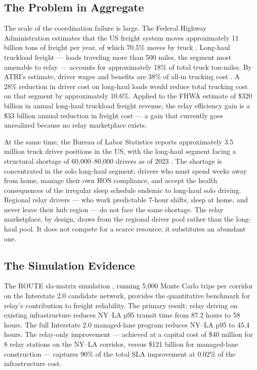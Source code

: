 \subsection*{The Problem in Aggregate}

The scale of the coordination failure is large. The Federal Highway Administration estimates that the US freight system moves approximately 11 billion tons of freight per year, of which 70.5\% moves by truck \citep{FHWA_freight2023}. Long-haul truckload freight --- loads traveling more than 500 miles, the segment most amenable to relay --- accounts for approximately 18\% of total truck ton-miles. By ATRI's estimate, driver wages and benefits are 38\% of all-in trucking cost \citep{ATRI_shortage2024}. A 28\% reduction in driver cost on long-haul loads would reduce total trucking cost on that segment by approximately 10.6\%. Applied to the FHWA estimate of \$320 billion in annual long-haul truckload freight revenue, the relay efficiency gain is a \$33 billion annual reduction in freight cost --- a gain that currently goes unrealized because no relay marketplace exists.

At the same time, the Bureau of Labor Statistics reports approximately 3.5 million truck driver positions in the US, with the long-haul segment facing a structural shortage of 60,000--80,000 drivers as of 2023 \citep{BLS_trucking2023}. The shortage is concentrated in the solo long-haul segment: drivers who must spend weeks away from home, manage their own HOS compliance, and accept the health consequences of the irregular sleep schedule endemic to long-haul solo driving. Regional relay drivers --- who work predictable 7-hour shifts, sleep at home, and never leave their hub region --- do not face the same shortage. The relay marketplace, by design, draws from the regional driver pool rather than the long-haul pool. It does not compete for a scarce resource; it substitutes an abundant one.

\subsection*{The Simulation Evidence}

The ROUTE sla-matrix simulation \citep{ROUTE_C1}, running 5,000 Monte Carlo trips per corridor on the Interstate 2.0 candidate network, provides the quantitative benchmark for relay's contribution to freight reliability. The primary result: relay driving on existing infrastructure reduces NY--LA p95 transit time from 87.2 hours to 58 hours. The full Interstate 2.0 managed-lane program reduces NY--LA p95 to 45.4 hours. The relay-only improvement --- achieved at a capital cost of \$40 million for 8 relay stations on the NY--LA corridor, versus \$121 billion for managed-lane construction \citep{ROUTE_E1} --- captures 90\% of the total SLA improvement at 0.02\% of the infrastructure cost.

